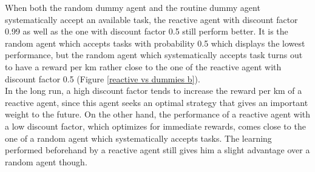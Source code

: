\documentclass[10pt]{article}
\begin{document}
When both the random dummy agent and the routine dummy agent systematically accept an available task, the reactive agent with discount factor 0.99 as well as the one with discount factor 0.5 still perform better.
It is the random agent which accepts tasks with probability 0.5 which displays the lowest performance, but the random agent which systematically accepts task turns out to have a reward per km rather close to the one of the reactive agent with discount factor 0.5 (Figure \ref{reactive vs dummies b}).\\

\noindent
In the long run, a high discount factor tends to increase the reward per km of a reactive agent, since this agent seeks an optimal strategy that gives an important weight to the future.
On the other hand, the performance of a reactive agent with a low discount factor, which optimizes for immediate rewards, comes close to the one of a random agent which systematically accepts tasks. The learning performed beforehand by a reactive agent still gives him a slight advantage over a random agent though.
\end{document}
